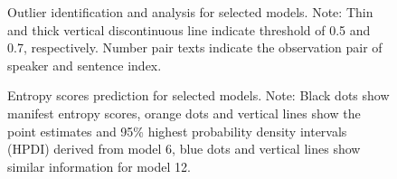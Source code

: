 \documentclass[
sn-apacite
]{sn-jnl}
\begin{document}
\label{cell-fig-rq1-model-outliers}
\begin{figure}[H]


\caption{\label{fig-rq1-model-outliers}Outlier identification and
analysis for selected models. Note: Thin and thick vertical
discontinuous line indicate threshold of 0.5 and 0.7, respectively.
Number pair texts indicate the observation pair of speaker and sentence
index.}

\end{figure}%

\label{cell-fig-rq3-pred-speaker}
\begin{figure}[H]


\caption{\label{fig-rq3-pred-speaker}Entropy scores prediction for
selected models. Note: Black dots show manifest entropy scores, orange
dots and vertical lines show the point estimates and 95\% highest
probability density intervals (HPDI) derived from model 6, blue dots and
vertical lines show similar information for model 12.}

\end{figure}%
\end{document}
